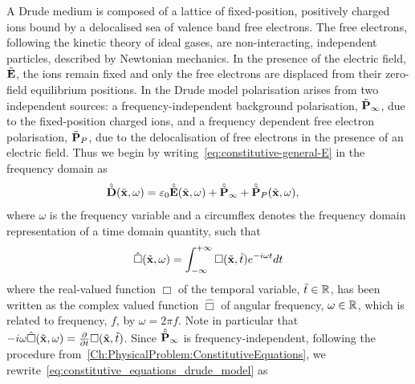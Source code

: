 %
%
A Drude medium is composed of a lattice of fixed-position, positively charged
ions bound by a delocalised sea of valence band free
electrons\cite{Ashcroft:2005wp,Bandyopadhyay:1503732}. The free electrons,
following the kinetic theory of ideal gases, are non-interacting, independent
particles, described by Newtonian mechanics. In the presence of the electric
field, $\tilde{\mathbf{E}}$, the ions remain fixed and only the free electrons are
displaced from their zero-field equilibrium positions. In the Drude model
polarisation arises from two independent sources: a frequency-independent background polarisation,
$\tilde{\mathbf{P}}_{\infty}$, due to the fixed-position charged ions, and
a frequency dependent free electron polarisation, $\tilde{\mathbf{P}}_P$, due to the delocalisation of
free electrons in the presence of an electric field.
Thus we begin by writing~\eqref{eq:constitutive-general-E} in the frequency domain as
\begin{align}
  \hat{\tilde{\mathbf{D}}}(\tilde{\mathbf{x}},\omega) &= \varepsilon_0 \hat{\tilde{\mathbf{E}}}(\tilde{\mathbf{x}}, \omega) + \hat{\tilde{\mathbf{P}}}_{\infty} + \hat{\tilde{\mathbf{P}}}_P(\tilde{\mathbf{x}},\omega) ,
                                    \label{eq:constitutive_equations_drude_model}
\end{align}
where $\omega$ is the frequency variable and a circumflex denotes the frequency domain representation of a time domain quantity, such that
$$
\hat{\Box}(\tilde{\mathbf{x}},\omega) = \int_{-\infty}^{+\infty} \Box(\tilde{\mathbf{x}},\tilde{t}) e^{-i \omega t} dt
$$
where the real-valued function $\Box$ of the temporal variable, $\tilde{t} \in \mathbb{R}$, has
been written as the complex valued function $\hat{\Box}$ of angular frequency, $\omega \in \mathbb{R}$, which is related to frequency, $f$, by $\omega = 2 \pi f$. Note in particular that $- i \omega
\hat{\Box}(\tilde{\mathbf{x}},\omega) = \frac{\partial}{\partial t}  \Box(\tilde{\mathbf{x}},\tilde{t})$.
Since $\hat{\tilde{\mathbf{P}}}_{\infty}$ is frequency-independent, following the procedure from~\autoref{Ch:PhysicalProblem:ConstitutiveEquations}, we rewrite~\eqref{eq:constitutive_equations_drude_model} as
